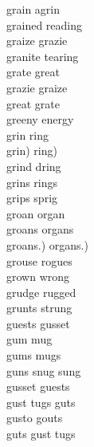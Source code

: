 grain agrin\\
grained reading\\
graize grazie\\
granite tearing\\
grate great\\
grazie graize\\
great grate\\
greeny energy\\
grin ring\\
grin) ring)\\
grind dring\\
grins rings\\
grips sprig\\
groan organ\\
groans organs\\
groans.) organs.)\\
grouse rogues\\
grown wrong\\
grudge rugged\\
grunts strung\\
guests gusset\\
gum mug\\
gums mugs\\
guns snug sung\\
gusset guests\\
gust tugs guts\\
gusto gouts\\
guts gust tugs\\

